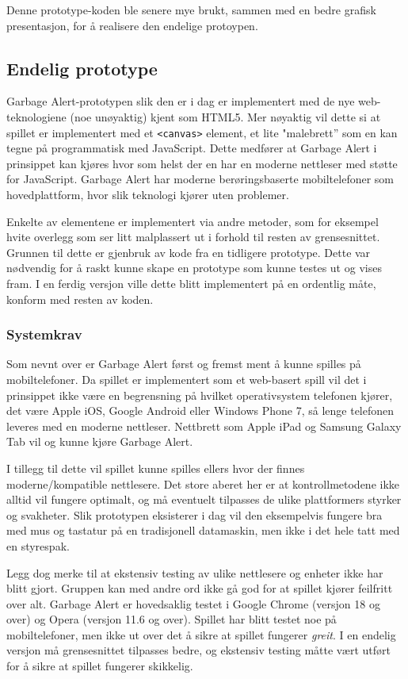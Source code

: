 Denne prototype-koden ble senere mye brukt, sammen med en bedre grafisk
presentasjon, for å realisere den endelige protoypen.

\subsection{Endelig prototype}
Garbage Alert-prototypen slik den er i dag er implementert med de nye
web-teknologiene (noe unøyaktig) kjent som HTML5. Mer nøyaktig vil dette
si at spillet er implementert med et \texttt{<canvas>} element, et lite
"malebrett'' som en kan tegne på programmatisk med JavaScript. Dette
medfører at Garbage Alert i prinsippet kan kjøres hvor som helst der en
har en moderne nettleser med støtte for JavaScript. Garbage Alert har
moderne berøringsbaserte mobiltelefoner som hovedplattform, hvor slik
teknologi kjører uten problemer.

Enkelte av elementene er implementert via andre metoder, som for
eksempel hvite overlegg som ser litt malplassert ut i forhold til resten
av grensesnittet. Grunnen til dette er gjenbruk av kode fra en tidligere
prototype. Dette var nødvendig for å raskt kunne skape en prototype som
kunne testes ut og vises fram. I en ferdig versjon ville dette blitt
implementert på en ordentlig måte, konform med resten av koden.


\subsubsection{Systemkrav}
Som nevnt over er Garbage Alert først og fremst ment å kunne spilles på
mobiltelefoner.
Da spillet er implementert som et web-basert spill vil det i prinsippet
ikke være en begrensning på hvilket operativsystem telefonen kjører, det
være Apple iOS, Google Android eller Windows Phone 7, så lenge telefonen
leveres med en moderne nettleser. Nettbrett som Apple iPad og Samsung
Galaxy Tab vil og kunne kjøre Garbage Alert.

I tillegg til dette vil spillet kunne spilles ellers hvor der finnes
moderne/kompatible nettlesere. Det store aberet her er at
kontrollmetodene ikke alltid vil fungere optimalt, og må eventuelt
tilpasses de ulike plattformers styrker og svakheter. Slik prototypen
eksisterer i dag vil den eksempelvis fungere bra med mus og tastatur på
en tradisjonell datamaskin, men ikke i det hele tatt med en styrespak.

Legg dog merke til at ekstensiv testing av ulike nettlesere og enheter
ikke har blitt gjort. Gruppen kan med andre ord ikke gå god for at
spillet kjører feilfritt over alt. Garbage Alert er hovedsaklig testet i
Google Chrome (versjon 18 og over) og Opera (versjon 11.6 og over).
Spillet har blitt testet noe på mobiltelefoner, men ikke ut over det å
sikre at spillet fungerer \emph{greit}. I en endelig versjon må
grensesnittet tilpasses bedre, og ekstensiv testing måtte vært utført
for å sikre at spillet fungerer skikkelig.

